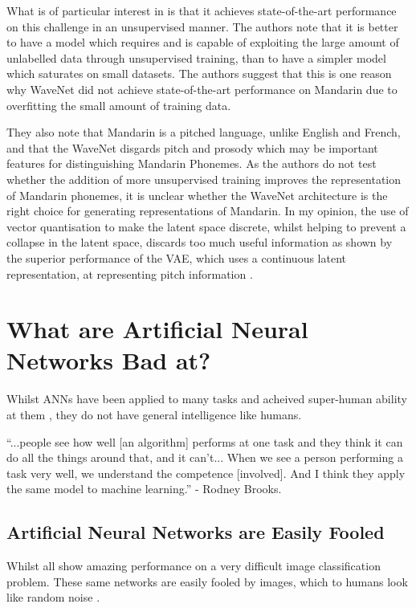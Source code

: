 What is of particular interest in \cite{wavenet} is that it achieves state-of-the-art performance on this challenge in an unsupervised manner. The authors note that it is better to have a model which requires and is capable of exploiting the large amount of unlabelled data through unsupervised training, than to have a simpler model which saturates on small datasets. The authors suggest that this is one reason why WaveNet did not achieve state-of-the-art performance on Mandarin due to overfitting the small amount of training data.

They also note that Mandarin is a pitched language, unlike English and French, and that the WaveNet disgards pitch and prosody \cite{van2017neural} which may be important features for distinguishing Mandarin Phonemes. As the authors do not test whether the addition of more unsupervised training improves the representation of Mandarin phonemes, it is unclear whether the WaveNet architecture is the right choice for generating representations of Mandarin. In my opinion, the use of vector quantisation to make the latent space discrete, whilst helping to prevent a collapse in the latent space, discards too much useful information as shown by the superior performance of the \ac{VAE}, which uses a continuous latent representation, at representing pitch information \cite{wavenet}. 

\section{What are Artificial Neural Networks Bad at?}
Whilst ANNs have been applied to many tasks and acheived super-human ability at them \cite{vinyals2019alphastar}, they do not have general intelligence like humans.

\begin{displayquote}
``...people see how well [an algorithm] performs at one task and they think it can do all the things around that, and it can’t... When we see a person performing a task very well, we understand the competence [involved]. And I think they apply the same model to machine learning.'' - Rodney Brooks.
\end{displayquote}

\subsection{Artificial Neural Networks are Easily Fooled}
Whilst \cite{krizhevsky2012imagenet, simonyan2014very, szegedy2015going, szegedy2016rethinking, szegedy2017inception, he2016deep, huang2017densely, russakovsky2015imagenet, chiu2018state, eslami2018neural} all show amazing performance on a very difficult image classification problem. These same networks are easily fooled by images, which to humans look like random noise \cite{nguyen2015deep}.


